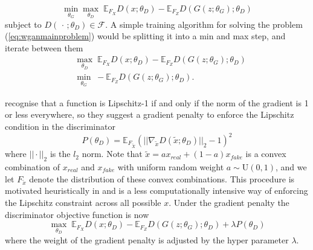 \documentclass[12pt]{article}
\newcommand*\ev[1]{\mathop{\mathbb E\/} \left[#1\right]}
\begin{document}
\begin{equation}
\min_{\theta_G} \max_{\theta_D} \; \mathbb{E}_{F_X} D(x; \theta_D) - \mathbb{E}_{F_Z} D(G(z; \theta_G); \theta_D) \label{eq:wganmainproblem}
\end{equation}
%
subject to $D(\, \cdot \,; \theta_D) \in \mathcal{F}$.
A simple training algorithm for solving the problem (\ref{eq:wganmainproblem}) would be splitting it into a min and max step, and iterate between them \citep{goodfellow2014generative}
\begin{align}
&\max_{\theta_D} \; \mathbb{E}_{F_X} D(x; \theta_D) - \mathbb{E}_{F_Z} D(G(z; \theta_G); \theta_D) \label{eq:maxdis}\\
&\min_{\theta_G} \; - \mathbb{E}_{F_Z} D(G(z; \theta_G); \theta_D). \label{eq:mingen}
\end{align}

\citet{gulrajani2017improved} recognise that a function is Lipschitz-1 if and only if the norm of the gradient is 1 or less everywhere, so they suggest a gradient penalty to enforce the Lipschitz condition in the discriminator
$$P(\theta_D) = \mathbb{E}_{F_{\tilde{X}}} \left( |\!| \nabla_{\tilde{x}} D(\tilde{x}; \theta_D) |\!|_2 - 1\right)^2$$
where $|| \cdot ||_2$ is the $l_2$ norm. Note that $\tilde{x} = a x_{real} + (1-a) x_{fake}$ is a convex combination of $x_{real}$ and $x_{fake}$ with uniform random weight $a \sim \text{U}(0, 1)$, and we let $F_{\tilde{x}}$ denote the distribution of these convex combinations. This procedure is motivated heuristically in \citet{gulrajani2017improved} and is a less computationally intensive way of enforcing the Lipschitz constraint across all possible $x$. Under the gradient penalty the discriminator objective function is now
\begin{equation}
\max_{\theta_D} \; \mathbb{E}_{F_X} D(x; \theta_D) - \mathbb{E}_{F_Z} D(G(z; \theta_G); \theta_D) + \lambda P(\theta_D) \label{eq:penalizedwgandis}
\end{equation}
where the weight of the gradient penalty is adjusted by the hyper parameter $\lambda$.
\end{document}
